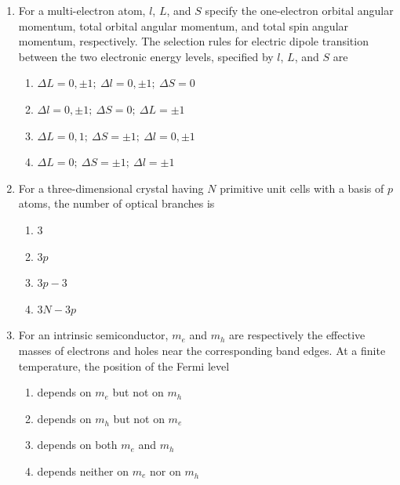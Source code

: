 \documentclass[journal,12pt,onecolumn]{IEEEtran}
\begin{document}
\begin{enumerate}
\item For a multi-electron atom, $l$, $L$, and $S$ specify the one-electron orbital angular momentum, total orbital angular momentum, and total spin angular momentum, respectively. The selection rules for electric dipole transition between the two electronic energy levels, specified by $l$, $L$, and $S$ are  

\hfill{}

\begin{multicols}{2}
\begin{enumerate}
    \item $\Delta L = 0, \pm 1;\ \Delta l = 0, \pm 1;\ \Delta S = 0$
    \item $\Delta l = 0, \pm 1;\ \Delta S = 0;\ \Delta L = \pm 1$
    \item $\Delta L = 0, 1;\ \Delta S = \pm 1;\ \Delta l = 0, \pm 1$
    \item $\Delta L = 0;\ \Delta S = \pm 1;\ \Delta l = \pm 1$
\end{enumerate}
\end{multicols}

\item For a three-dimensional crystal having $N$ primitive unit cells with a basis of $p$ atoms, the number of optical branches is  

\hfill{}

\begin{multicols}{4}
\begin{enumerate}
    \item $3$
    \item $3p$
    \item $3p - 3$
    \item $3N - 3p$
\end{enumerate}
\end{multicols}

\item For an intrinsic semiconductor, $m_{e}^{}$ and $m_{h}^{}$ are respectively the effective masses of electrons and holes near the corresponding band edges. At a finite temperature, the position of the Fermi level  

\hfill{}

\begin{enumerate}
    \item depends on $m_{e}^{}$ but not on $m_{h}^{}$
    \item depends on $m_{h}^{}$ but not on $m_{e}^{}$
    \item depends on both $m_{e}^{}$ and $m_{h}^{}$
    \item depends neither on $m_{e}^{}$ nor on $m_{h}^{}$
\end{enumerate}


\end{enumerate}
\end{document}
